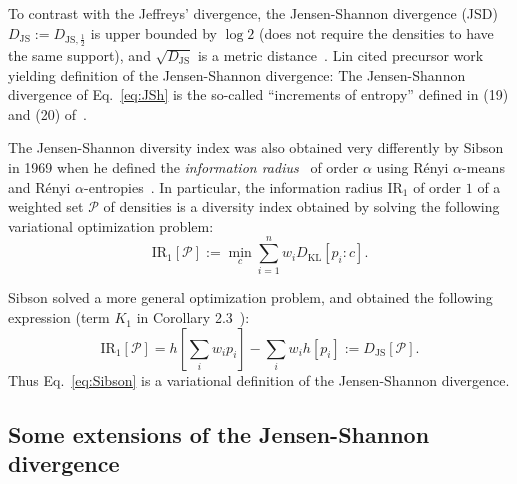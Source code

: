 \documentclass[11pt]{article}
\def\KL{\mathrm{KL}}
\def\calP{\mathcal{P}}
\def\KL{\mathrm{KL}}
\def\JS{\mathrm{JS}}
\def\IR{\mathrm{IR}}
\begin{document}
To contrast with the Jeffreys' divergence, the Jensen-Shannon divergence (JSD) $D_\JS:=D_{\JS,\frac{1}{2}}$ is upper bounded by $\log 2$ (does not require the densities to have the same support), and $\sqrt{D_\JS}$ is 
a metric distance~\cite{JSmetric-2003,JSmetric-2004}.
Lin cited precursor work~\cite{WongYOU-1985,JW-1988} yielding definition of the Jensen-Shannon divergence:
The Jensen-Shannon divergence  of Eq.~\ref{eq:JSh} is the so-called ``increments of entropy'' defined in (19) and (20) of~\cite{WongYOU-1985}.

The Jensen-Shannon diversity index was also obtained very differently by Sibson in 1969 when he defined the {\em information radius}~\cite{Sibson-1969} of order $\alpha$ using R\'enyi $\alpha$-means and R\'enyi $\alpha$-entropies~\cite{Renyi-1961}.
In particular, the information radius $\IR_1$ of order $1$ of a weighted set $\calP$ of densities is a diversity index obtained by solving the following variational optimization problem:
\begin{equation}
\IR_{1}[\calP]:=\min_{c} \sum_{i=1}^n w_i D_\KL[p_i:c].  \label{eq:Sibson}
\end{equation}

Sibson solved a more general optimization problem, and obtained the following expression (term $K_1$ in Corollary 2.3~\cite{Sibson-1969}):
$$
\IR_{1}[\calP]=  h\left[\sum_i w_ip_i\right]-\sum_i w_i h[p_i]:=D_\JS[\calP].
$$
Thus Eq.~\ref{eq:Sibson} is a variational definition of the Jensen-Shannon divergence.

\subsection{Some extensions of the Jensen-Shannon divergence}
\end{document}
